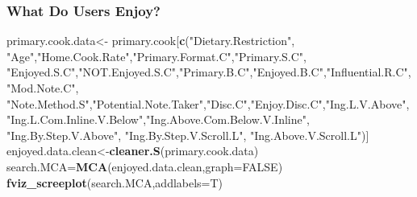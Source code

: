 \documentclass[
]{article}
\newenvironment{Shaded}{\begin{snugshade}}{\end{snugshade}}
\newcommand{\CommentTok}[1]{\textcolor[rgb]{0.56,0.35,0.01}{\textit{#1}}}
\newcommand{\DataTypeTok}[1]{\textcolor[rgb]{0.13,0.29,0.53}{#1}}
\newcommand{\KeywordTok}[1]{\textcolor[rgb]{0.13,0.29,0.53}{\textbf{#1}}}
\newcommand{\NormalTok}[1]{#1}
\newcommand{\OperatorTok}[1]{\textcolor[rgb]{0.81,0.36,0.00}{\textbf{#1}}}
\newcommand{\OtherTok}[1]{\textcolor[rgb]{0.56,0.35,0.01}{#1}}
\newcommand{\StringTok}[1]{\textcolor[rgb]{0.31,0.60,0.02}{#1}}
\begin{document}
\begin{Shaded}
\end{Shaded}

\hypertarget{what-do-users-enjoy-3}{%
\subsubsection{What Do Users Enjoy?}\label{what-do-users-enjoy-3}}

\begin{Shaded}
\begin{Highlighting}[]
\NormalTok{primary.cook.data<-}\StringTok{ }\NormalTok{primary.cook[}\KeywordTok{c}\NormalTok{(}\StringTok{"Dietary.Restriction"}\NormalTok{, }\StringTok{"Age"}\NormalTok{,}\StringTok{"Home.Cook.Rate"}\NormalTok{,}\StringTok{"Primary.Format.C"}\NormalTok{,}\StringTok{"Primary.S.C"}\NormalTok{,}
            \StringTok{"Enjoyed.S.C"}\NormalTok{,}\StringTok{"NOT.Enjoyed.S.C"}\NormalTok{,}\StringTok{"Primary.B.C"}\NormalTok{,}\StringTok{"Enjoyed.B.C"}\NormalTok{,}\StringTok{"Influential.R.C"}\NormalTok{, }
            \StringTok{"Mod.Note.C"}\NormalTok{, }
            \StringTok{"Note.Method.S"}\NormalTok{,}\StringTok{"Potential.Note.Taker"}\NormalTok{,}\StringTok{"Disc.C"}\NormalTok{,}\StringTok{"Enjoy.Disc.C"}\NormalTok{,}\StringTok{"Ing.L.V.Above"}\NormalTok{,}
            \StringTok{"Ing.L.Com.Inline.V.Below"}\NormalTok{,}\StringTok{"Ing.Above.Com.Below.V.Inline"}\NormalTok{,  }\StringTok{"Ing.By.Step.V.Above"}\NormalTok{,  }\StringTok{"Ing.By.Step.V.Scroll.L"}\NormalTok{,}
            \StringTok{"Ing.Above.V.Scroll.L"}\NormalTok{)]}
\NormalTok{enjoyed.data.clean<-}\KeywordTok{cleaner.S}\NormalTok{(primary.cook.data)}
\NormalTok{search.MCA=}\KeywordTok{MCA}\NormalTok{(enjoyed.data.clean,}\DataTypeTok{graph=}\OtherTok{FALSE}\NormalTok{)}
\KeywordTok{fviz_screeplot}\NormalTok{(search.MCA,}\DataTypeTok{addlabels=}\NormalTok{T)}
\end{Highlighting}
\end{Shaded}
\end{document}
